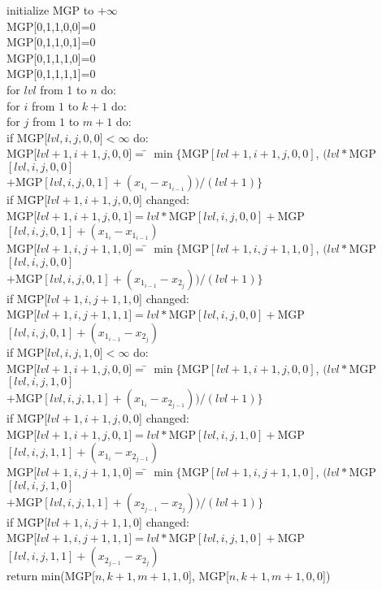 \documentclass{article}
\begin{document}
\begin{enumerate}
\begin{tabbing}
\>initialize MGP to $+\infty$\\
\>MGP[0,1,1,0,0]=0\\
\>MGP[0,1,1,0,1]=0\\
\>MGP[0,1,1,1,0]=0\\
\>MGP[0,1,1,1,1]=0\\
\>for $lvl$ from 1 to $n$ do:\\
\>\>for $i$ from $1$ to $k+1$ do:\\
\>\>\>for $j$ from $1$ to $m+1$ do:\\
\>\>\>\>if MGP[$lvl,i,j,0,0]<\infty$ do:\\
\>\>\>\>\>MGP[$lvl+1,i+1,j,0,0]=$\= $\min\{$MGP$[lvl+1,i+1,j,0,0]$, $(lvl*$MGP$[lvl,i,j,0,0]$ \\
\>\>\>\>\>\>$+$MGP$[lvl,i,j,0,1]+(x_{1_{i}}-x_{1_{i-1}}))/(lvl+1)\}$\\
\>\>\>\>\>if M\= GP[$lvl+1,i+1,j,0,0$] changed:\\
\>\>\>\>\>\>MGP[$lvl+1,i+1,j,0,1]=lvl*$MGP$[lvl,i,j,0,0]+$MGP$[lvl,i,j,0,1]+(x_{1_{i}}-x_{1_{i-1}})$\\
\>\>\>\>\>MGP[$lvl+1,i,j+1,1,0]=$\= $\min\{$MGP$[lvl+1,i,j+1,1,0]$, $(lvl*$MGP$[lvl,i,j,0,0]$ \\
\>\>\>\>\>\>$+$MGP$[lvl,i,j,0,1]+(x_{1_{i-1}}-x_{2_{j}}))/(lvl+1)\}$\\
\>\>\>\>\>if M\= GP[$lvl+1,i,j+1,1,0$] changed:\\
\>\>\>\>\>\>MGP[$lvl+1,i,j+1,1,1]=lvl*$MGP$[lvl,i,j,0,0]+$MGP$[lvl,i,j,0,1]+(x_{1_{i-1}}-x_{2_{j}})$\\
\>\>\>\>if MGP[$lvl,i,j,1,0]<\infty$ do:\\
\>\>\>\>\>MGP[$lvl+1,i+1,j,0,0]=$\= $\min\{$MGP$[lvl+1,i+1,j,0,0]$, $(lvl*$MGP$[lvl,i,j,1,0]$ \\
\>\>\>\>\>\>$+$MGP$[lvl,i,j,1,1]+(x_{1_{i}}-x_{2_{j-1}}))/(lvl+1)\}$\\
\>\>\>\>\>if M\= GP[$lvl+1,i+1,j,0,0$] changed:\\
\>\>\>\>\>\>MGP[$lvl+1,i+1,j,0,1]=lvl*$MGP$[lvl,i,j,1,0]+$MGP$[lvl,i,j,1,1]+(x_{1_{i}}-x_{2_{j-1}})$\\
\>\>\>\>\>MGP[$lvl+1,i,j+1,1,0]=$\= $\min\{$MGP$[lvl+1,i,j+1,1,0]$, $(lvl*$MGP$[lvl,i,j,1,0]$ \\
\>\>\>\>\>\>$+$MGP$[lvl,i,j,1,1]+(x_{2_{j-1}}-x_{2_{j}}))/(lvl+1)\}$\\
\>\>\>\>\>if M\= GP[$lvl+1,i,j+1,1,0$] changed:\\
\>\>\>\>\>\>MGP[$lvl+1,i,j+1,1,1]=lvl*$MGP$[lvl,i,j,1,0]+$MGP$[lvl,i,j,1,1]+(x_{2_{j-1}}-x_{2_{j}})$\\
\>return min(MGP[$n,k+1,m+1,1,0]$, MGP[$n,k+1,m+1,0,0$])
\end{tabbing}



\end{enumerate}
\end{document}
